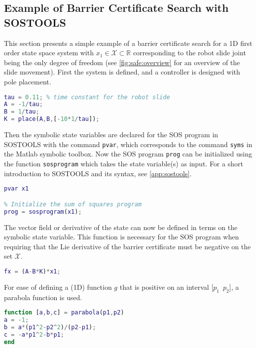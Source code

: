 \subsection{Example of Barrier Certificate Search with SOSTOOLS}
This section presents a simple example of a barrier certificate search for a 1D first order state space system with $x_1\in\mathcal{X}\subset\mathbb{R}$ corresponding to the robot slide joint being the only degree of freedom (see \autoref{fig:safe:overview} for an overview of the slide movement). First the system is defined, and a controller is designed with pole placement.
\begin{lstlisting}[language=matlab]
% Define state-space system with x1 = robot position
tau = 0.11; % time constant for the robot slide
A = -1/tau;
B = 1/tau;
K = place(A,B,[-10*1/tau]);
\end{lstlisting}
Then the symbolic state variables are declared for the SOS program in SOSTOOLS with the command \texttt{pvar}, which corresponds to the command \texttt{syms} in the Matlab symbolic toolbox. Now the SOS program \texttt{prog} can be initialized using the function \texttt{sosprogram} which takes the state variable(s) as input. For a short introduction to SOSTOOLS and its syntax, see \autoref{app:sostools}.
\begin{lstlisting}[language=matlab]
% Declare state variables
pvar x1

% Initialize the sum of squares program
prog = sosprogram(x1);
\end{lstlisting}
The vector field or derivative of the state can now be defined in terms on the symbolic state variable. This function is necessary for the SOS program when requiring that the Lie derivative of the barrier certificate must be negative on the set $\mathcal{X}$.
\begin{lstlisting}[language=matlab]
% Vector field dx/dt = fx (closed loop)
fx = (A-B*K)*x1;
\end{lstlisting}
For ease of defining a (1D) function $g$ that is positive on an interval [$p_1\,\,\, p_2$], a parabola function is used.
\begin{lstlisting}[language=matlab]
function [a,b,c] = parabola(p1,p2)
a = -1;
b = a*(p1^2-p2^2)/(p2-p1);
c = -a*p1^2-b*p1;
end
\end{lstlisting}
